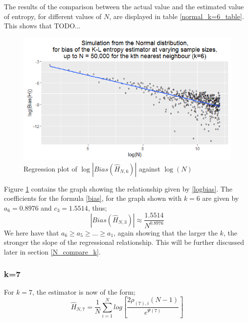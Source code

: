 \documentclass{article}
\begin{document}
The results of the comparison between the actual value and the estimated value of entropy, for different values of $N$, are displayed in table \ref{normal_k=6_table}. This shows that TODO...

\begin{figure}
  \begin{center}
    \includegraphics[width=\textwidth]{./Graphs/new_normal_k=6.png}
  \end{center}
\caption{Regression plot of $\log|Bias(\hat{H}_{N, 6})|$ against $\log(N)$}
  \label{normal_k=6_graph}
\end{figure}

Figure \ref{normal_k=6_graph} contains the graph showing the relationship given by \ref{logbias}. The coefficients for the formula \ref{bias}, for the graph shown with $k=6$ are given by $a_{6} = 0.8976$ and $c_{3} = 1.5514$, thus;
\begin{equation}
|Bias(\hat{H}_{N, 3})| \approx \frac{1.5514}{N^{0.8976}} \nonumber
\end{equation}
We here have that $a_{6} \geq a_{5} \geq ... \geq a_{1}$, again showing that the larger the $k$, the stronger the slope of the regressional relationship. This will be further discussed later in section \ref{N_compare_k}.




\subsubsection{k=7} \label{N_k=7}
For $k=7$, the estimator is now of the form;
\begin{equation}
\hat{H}_{N, 7} = \frac{1}{N} \sum_{i=1}^{N} log \left[ \frac{2\rho_{(7),i} (N-1)}{e^{\Psi(7)}} \right] \nonumber
\end{equation}
\end{document}
